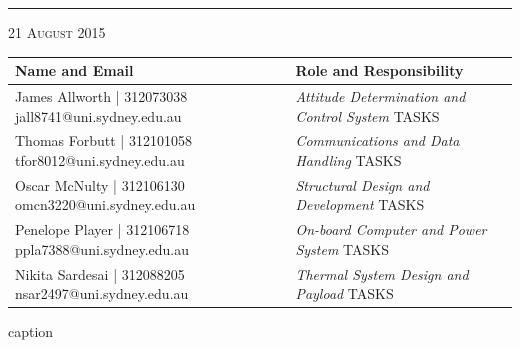 \begin{titlepage}
\begin{center}
\begin{minipage}{\linewidth}
    \vspace{1cm}
    \hrule
    \vspace{1.3cm}
     {\large \textsc{21 August 2015 }}
\vspace{1.3cm}
    \begin{table}[H]
        \centering
        \vspace{0.2cm}
        \label{tab:maxturbulencealpha}
        {\renewcommand{\arraystretch}{1.7}%
            \begin{tabular}{|>{\centering\arraybackslash}m{6cm}|>{\centering\arraybackslash}m{9cm}|}
                \hline
                \textbf{Name and Email} & \textbf{Role and Responsibility} \\ \hline\hline
                James Allworth | 312073038  jall8741@uni.sydney.edu.au & \textit{Attitude Determination and Control System} \newline TASKS  \\\hline
                Thomas Forbutt | 312101058  tfor8012@uni.sydney.edu.au & \textit{Communications and Data Handling} \newline TASKS \\\hline
                Oscar McNulty | 312106130  omcn3220@uni.sydney.edu.au & \textit{Structural Design and Development} \newline TASKS \\\hline
                Penelope Player | 312106718  ppla7388@uni.sydney.edu.au & \textit{On-board Computer and Power System} \newline TASKS \\\hline
                Nikita Sardesai | 312088205  nsar2497@uni.sydney.edu.au & \textit{Thermal System Design and Payload} \newline TASKS \\\hline
                \end{tabular} } 
        \end{table}
    
\end{minipage}
\end{center}

\end{titlepage}


 \begin{table}[H]
     \centering
     \caption{caption}
     \vspace{0.2cm}
     \label{tab:}
     {\renewcommand{\arraystretch}{1.7}%
         \begin{tabular}{|>{\centering\arraybackslash}m{6cm}|>{\centering\arraybackslash}m{9cm}|}
             
             \end{tabular} } 
        \end{table}
